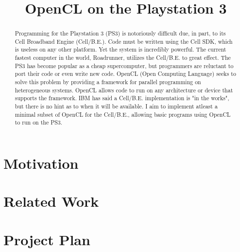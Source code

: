 \documentclass[conference]{IEEEtran}
\begin{document}
\title{OpenCL on the Playstation 3}

\author{
}

\maketitle

\begin{abstract}
Programming for the Playstation 3 (PS3) is notoriously difficult due, in part, to its Cell Broadband Engine (Cell/B.E.).
Code must be written using the Cell SDK, which is useless on any other platform. Yet the system is incredibly powerful.
The current fastest computer in the world, Roadrunner, utilizes the Cell/B.E. to great effect.
The PS3 has become popular as a cheap supercomputer, but programmers are reluctant to port their code or even write new code.
OpenCL (Open Computing Language) seeks to solve this problem by providing a framework for parallel programming on heterogeneous systems.
OpenCL allows code to run on any architecture or device that supports the framework.
IBM has said a Cell/B.E. implementation is "in the works", but there is no hint as to when it will be available.
I aim to implement atleast a minimal subset of OpenCL for the Cell/B.E., allowing basic programs using OpenCL to run on the PS3.

\end{abstract}

\section{Motivation}\label{sec:motivation}


\section{Related Work}


\section{Project Plan}

\end{document}
